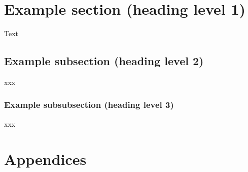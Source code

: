 \documentclass[11pt, a4paper]{article}
\begin{document}
\section{Example section (heading level 1)}

Text

\subsection{Example subsection (heading level 2)}

xxx

\subsubsection{Example subsubsection (heading level 3)}

xxx

\newpage



\newpage
\section{Appendices}
\end{document}
